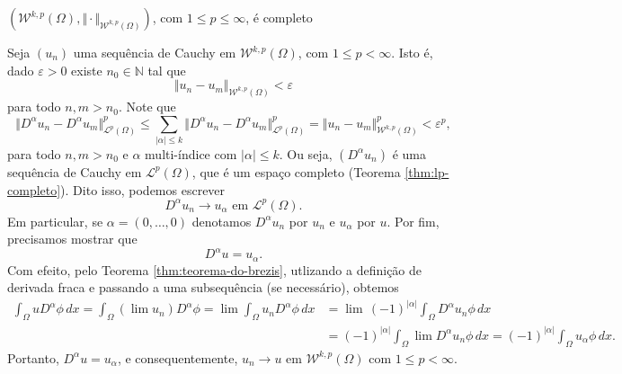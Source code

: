 \documentclass[a4paper, 11pt]{book}
\theoremstyle{definition}
\newcommand{\bN}{\mathbb{N}}
\newcommand{\cL}{\mathcal{L}}
\newcommand{\cW}{\mathcal{W}}
\begin{document}
\begin{tbox} \label{thm:sobolev-completo}
    $(\cW^{k,p}(\Omega), \Vert \cdot \Vert_{\cW^{k,p}(\Omega)})$, com $1 \leqslant p \leqslant \infty$, é completo
\end{tbox}
\begin{prf}
    Seja $(u_n)$ uma sequência de Cauchy em $\cW^{k,p}(\Omega)$, com $1 \leqslant p < \infty$. Isto é, dado $\varepsilon > 0$ existe $n_0 \in \bN$ tal que
    \[
        \Vert u_n - u_m \Vert_{\cW^{k,p}(\Omega)} < \varepsilon
    \]
    para todo $n,m > n_0$.
    Note que
    \[
        \Vert D^\alpha u_n - D^\alpha u_m \Vert_{\cL^p(\Omega)}^p \leqslant \sum_{|\alpha| \leqslant k} \Vert D^\alpha u_n - D^\alpha u_m \Vert_{\cL^p(\Omega)}^p = \Vert u_n - u_m \Vert_{\cW^{k,p}(\Omega)}^p < \varepsilon^p,
    \]
    para todo $n,m > n_0$ e $\alpha$ multi-índice com $|\alpha| \leqslant k$. Ou seja, $(D^\alpha u_n)$ é uma sequência de Cauchy em $\cL^p(\Omega)$, que é um espaço completo (Teorema \ref{thm:lp-completo}).
    Dito isso, podemos escrever
    \[
        D^\alpha u_n \to u_\alpha \text{ em } \cL^p(\Omega).
    \]
    Em particular, se $\alpha = (0,\dots,0)$ denotamos $D^\alpha u_n$ por $u_n$ e $u_\alpha$ por $u$.
    Por fim, precisamos mostrar que
    \[
        D^\alpha u = u_\alpha.
    \]
Com efeito, pelo Teorema \ref{thm:teorema-do-brezis}, utlizando a definição de derivada fraca e passando a uma subsequência (se necessário), obtemos
    \[
        \begin{aligned}
            \int_\Omega u D^\alpha \phi \, dx 
            = \int_\Omega (\lim u_n) D^\alpha \phi 
            = \lim\! \int_\Omega u_n D^\alpha \phi \,dx
            &= \lim\, (-1)^{|\alpha|}\!\int_\Omega  D^\alpha u_n \phi\,dx \\
            &= (-1)^{|\alpha|}\!\int_\Omega \lim D^\alpha u_n \phi \,dx 
            = (-1)^{|\alpha|}\!\int_\Omega u_\alpha \phi \,dx.
        \end{aligned}
    \]
    Portanto, $D^\alpha u = u_\alpha$, e consequentemente, $u_n \to u$ em $\cW^{k,p}(\Omega)$ com $1 \leqslant p < \infty$.


\end{prf}
\end{document}
